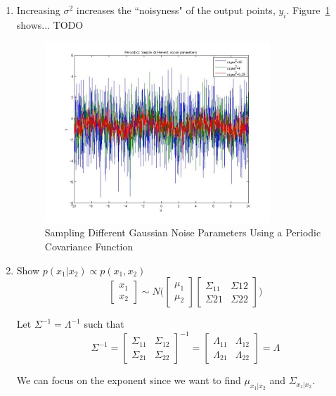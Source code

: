 \documentclass{article}
\begin{document}
\begin{enumerate}[label=(\alph*)]
\item Increasing $\sigma^2$ increases the ``noisyness" of the output points, $y_i$.
Figure~\ref{fig:1b} shows... TODO

\begin{figure}[H]
\centering
\includegraphics[width=0.8\textwidth]{1_b.jpg}
\caption{Sampling Different Gaussian Noise Parameters Using a Periodic Covariance Function}
\label{fig:1b}
\end{figure}

\item Show $p(x_1|x_2)\propto{}p(x_1,x_2)$ \\
\[
\begin{bmatrix}
  x_1 \\ x_2
\end{bmatrix}
\sim{}N \Bigg(
\begin{bmatrix}
  \mu_1 \\ \mu_2
\end{bmatrix}
\begin{bmatrix}
  \Sigma_{11} & \Sigma{12} \\ \Sigma{21} & \Sigma{22}
\end{bmatrix}
\Bigg)
\]

Let $\Sigma^{-1}=\Lambda^{-1}$ such that
\[
\Sigma^{-1}=
\begin{bmatrix}
  \Sigma_{11} & \Sigma_{12} \\ \Sigma_{21} & \Sigma_{22}
\end{bmatrix}
^{-1}=
\begin{bmatrix}
  \Lambda_{11} & \Lambda_{12} \\ \Lambda_{21} & \Lambda_{22}
\end{bmatrix}
=\Lambda
\]

We can focus on the exponent since we want to find $\mu_{x_1|x_2}$ and $\Sigma_{x_1|x_2}$.


\end{enumerate}
\end{document}
